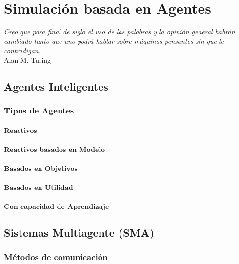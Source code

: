 
\chapter*{Simulación basada en Agentes} \label{cap1}


\begin{flushright}
\begin{minipage}{7.85cm}
    {\em Creo que para final de siglo el uso de las palabras y la opinión
    general habrán cambiado tanto que uno podrá hablar sobre máquinas pensantes
    sin que le contradigan.} \\ Alan M. Turing
\end{minipage}
\end{flushright}

\vspace*{5mm}

\section*{Agentes Inteligentes}


\subsection*{Tipos de Agentes}


\subsubsection*{Reactivos}

\subsubsection*{Reactivos basados en Modelo}

\subsubsection*{Basados en Objetivos}

\subsubsection*{Basados en Utilidad}

\subsubsection*{Con capacidad de Aprendizaje}

\section*{Sistemas Multiagente (SMA)}


\subsection*{Métodos de comunicación}

